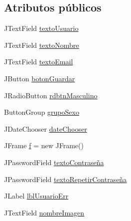 \subsection*{Atributos públicos}
\begin{DoxyCompactItemize}
\item 
J\-Text\-Field \hyperlink{classcom_1_1ucab_1_1javachat_1_1_cliente_1_1view_1_1_vent_modificar_a474b74c08d40f00481bc7e7c6004b40d}{texto\-Usuario}
\item 
J\-Text\-Field \hyperlink{classcom_1_1ucab_1_1javachat_1_1_cliente_1_1view_1_1_vent_modificar_a32f1374495a8394c7cc58807692f20ce}{texto\-Nombre}
\item 
J\-Text\-Field \hyperlink{classcom_1_1ucab_1_1javachat_1_1_cliente_1_1view_1_1_vent_modificar_a092cc79b753df5f9672bffd8303f0b6f}{texto\-Email}
\item 
J\-Button \hyperlink{classcom_1_1ucab_1_1javachat_1_1_cliente_1_1view_1_1_vent_modificar_ac3a2bf2a741a95469e8d8b36740b564a}{boton\-Guardar}
\item 
J\-Radio\-Button \hyperlink{classcom_1_1ucab_1_1javachat_1_1_cliente_1_1view_1_1_vent_modificar_aaace25e8a78f0a63fd8634a08b400cc8}{rdbtn\-Masculino}
\item 
Button\-Group \hyperlink{classcom_1_1ucab_1_1javachat_1_1_cliente_1_1view_1_1_vent_modificar_a80a7d37d3c40f61cb047f1216492f401}{grupo\-Sexo}
\item 
J\-Date\-Chooser \hyperlink{classcom_1_1ucab_1_1javachat_1_1_cliente_1_1view_1_1_vent_modificar_a569d7c266a6dee345c3b00db14fba73c}{date\-Chooser}
\item 
J\-Frame \hyperlink{classcom_1_1ucab_1_1javachat_1_1_cliente_1_1view_1_1_vent_modificar_afd0a584cc889ba35215622be0bf91cd1}{f} = new J\-Frame()
\item 
J\-Password\-Field \hyperlink{classcom_1_1ucab_1_1javachat_1_1_cliente_1_1view_1_1_vent_modificar_a55fc3d00a5ddc656635cddaf63a42aa2}{texto\-Contraseña}
\item 
J\-Password\-Field \hyperlink{classcom_1_1ucab_1_1javachat_1_1_cliente_1_1view_1_1_vent_modificar_a0a22b6c11825ee03316be0f9f12783ab}{texto\-Repetir\-Contraseña}
\item 
J\-Label \hyperlink{classcom_1_1ucab_1_1javachat_1_1_cliente_1_1view_1_1_vent_modificar_aab915a5c7399f2bd6ae4a02bf1c15099}{lbl\-Usuario\-Err}
\item 
J\-Text\-Field \hyperlink{classcom_1_1ucab_1_1javachat_1_1_cliente_1_1view_1_1_vent_modificar_a01c153fadbc0fa1989d904199b8fefe0}{nombre\-Imagen}
\end{DoxyCompactItemize}



